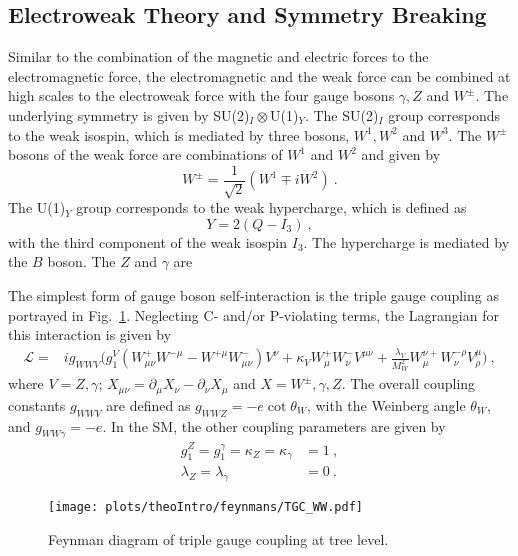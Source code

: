 \subsection{Electroweak Theory and Symmetry Breaking}
\label{subsec:theo:EWK}
Similar to the combination of the magnetic and electric forces to the electromagnetic force, the electromagnetic and the weak force can be combined at high scales to the electroweak force \cite{EWK} with the four gauge bosons $\gamma , Z$ and $W^\pm$. The underlying symmetry is given by SU(2)$_I\otimes$U(1)$_Y$. The SU(2)$_I$ group corresponds to the weak isospin, which is mediated by three bosons, $W^1,W^2$ and $W^3$. The $W^\pm$ bosons of the weak force are combinations of $W^1$ and $W^2$ and given by
\begin{equation}
W^\pm=\frac{1}{\sqrt{2}}\left( W^1 \mp iW^2 \right) ~.
\end{equation}  
The U(1)$_Y$ group corresponds to the weak hypercharge, which is defined as
\begin{equation}
Y=2(Q-I_3) ~,
\end{equation}
with the third component of the weak isospin $I_3$. The hypercharge is mediated by the $B$ boson. The $Z$ and $\gamma$ are  

The simplest form of gauge boson self-interaction is the triple gauge coupling as portrayed in Fig.~\ref{fig:theo:tgc}. Neglecting C- and/or P-violating terms, the Lagrangian for this interaction is given by \cite{EFT}
\begin{align}
\mathcal{L} =& ig_{WWV}\Big( g_1^V(W_{\mu\nu}^+W^{-\mu} - W^{+\mu}W_{\mu\nu}^-)V^{\nu} + \kappa_VW_\mu^+W_\nu^-V^{\mu\nu}  + \frac{\lambda_V}{M_W^2}W_\mu^{\nu+}W_\nu^{-\rho}V_\rho^\mu  \Big) ~, \label{eq:theo:EWKlag}
\end{align}
where $V=Z,\gamma$; $X_{\mu\nu}=\partial_\mu X_\nu -\partial_\nu X_\mu$ and $X=W^\pm,\gamma ,Z$. The overall coupling constants $g_{WWV}$ are defined as $g_{WWZ} = -e \cot \theta_W$, with the Weinberg angle $\theta_W$, and  $g_{WW\gamma} =-e$. In the SM, the other coupling parameters are given by
\begin{align}
g_1^Z = g_1^\gamma = \kappa_Z = \kappa_\gamma &= 1 ~, \\
\lambda_Z = \lambda_\gamma &= 0 ~.
\end{align}
\begin{figure}[]
	\centering
	\texttt{[image: plots/theoIntro/feynmans/TGC\_WW.pdf]}
	\caption[Feynman diagram of triple gauge coupling at tree level.]{Feynman diagram of triple gauge coupling at tree level.}
	\label{fig:theo:tgc}
\end{figure}

